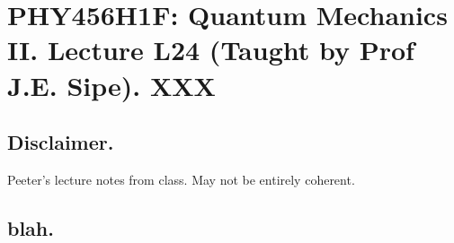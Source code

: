
%

\chapter{PHY456H1F: Quantum Mechanics II.  Lecture L24 (Taught by Prof J.E. Sipe).  XXX}
\label{chap:qmTwoL24}
{}
\date{Dec 5, 2011}

\beginArtWithToc

\section{Disclaimer.}

Peeter's lecture notes from class.  May not be entirely coherent.

\section{blah.}

\cite{desai2009quantum}

\EndArticle
